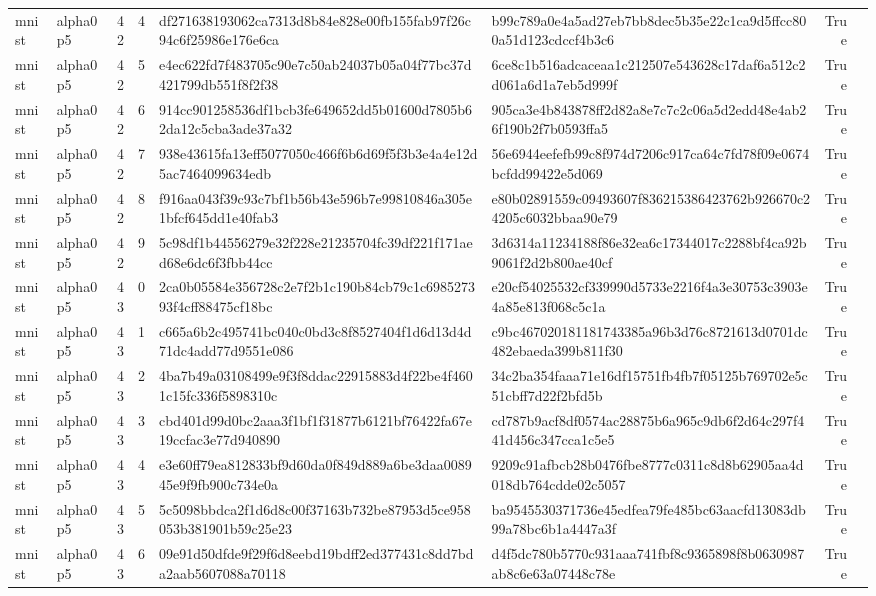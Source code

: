 \begin{tabular}{llrrllrl}
mnist & alpha0p5 & 42 & 4 & df271638193062ca7313d8b84e828e00fb155fab97f26c94c6f25986e176e6ca & b99c789a0e4a5ad27eb7bb8dec5b35e22c1ca9d5ffcc800a51d123cdccf4b3c6 & True &  \\
mnist & alpha0p5 & 42 & 5 & e4ec622fd7f483705c90e7c50ab24037b05a04f77bc37d421799db551f8f2f38 & 6ce8c1b516adcaceaa1c212507e543628c17daf6a512c2d061a6d1a7eb5d999f & True &  \\
mnist & alpha0p5 & 42 & 6 & 914cc901258536df1bcb3fe649652dd5b01600d7805b62da12c5cba3ade37a32 & 905ca3e4b843878ff2d82a8e7c7c2c06a5d2edd48e4ab26f190b2f7b0593ffa5 & True &  \\
mnist & alpha0p5 & 42 & 7 & 938e43615fa13eff5077050c466f6b6d69f5f3b3e4a4e12d5ac7464099634edb & 56e6944eefefb99c8f974d7206c917ca64c7fd78f09e0674bcfdd99422e5d069 & True &  \\
mnist & alpha0p5 & 42 & 8 & f916aa043f39c93c7bf1b56b43e596b7e99810846a305e1bfcf645dd1e40fab3 & e80b02891559c09493607f836215386423762b926670c24205c6032bbaa90e79 & True &  \\
mnist & alpha0p5 & 42 & 9 & 5c98df1b44556279e32f228e21235704fc39df221f171aed68e6dc6f3fbb44cc & 3d6314a11234188f86e32ea6c17344017c2288bf4ca92b9061f2d2b800ae40cf & True &  \\
mnist & alpha0p5 & 43 & 0 & 2ca0b05584e356728c2e7f2b1c190b84cb79c1c698527393f4cff88475cf18bc & e20cf54025532cf339990d5733e2216f4a3e30753c3903e4a85e813f068c5c1a & True &  \\
mnist & alpha0p5 & 43 & 1 & c665a6b2c495741bc040c0bd3c8f8527404f1d6d13d4d71dc4add77d9551e086 & c9bc467020181181743385a96b3d76c8721613d0701dc482ebaeda399b811f30 & True &  \\
mnist & alpha0p5 & 43 & 2 & 4ba7b49a03108499e9f3f8ddac22915883d4f22be4f4601c15fc336f5898310c & 34c2ba354faaa71e16df15751fb4fb7f05125b769702e5c51cbff7d22f2bfd5b & True &  \\
mnist & alpha0p5 & 43 & 3 & cbd401d99d0bc2aaa3f1bf1f31877b6121bf76422fa67e19ccfac3e77d940890 & cd787b9acf8df0574ac28875b6a965c9db6f2d64c297f441d456c347cca1c5e5 & True &  \\
mnist & alpha0p5 & 43 & 4 & e3e60ff79ea812833bf9d60da0f849d889a6be3daa008945e9f9fb900c734e0a & 9209c91afbcb28b0476fbe8777c0311c8d8b62905aa4d018db764cdde02c5057 & True &  \\
mnist & alpha0p5 & 43 & 5 & 5c5098bbdca2f1d6d8c00f37163b732be87953d5ce958053b381901b59c25e23 & ba9545530371736e45edfea79fe485bc63aacfd13083db99a78bc6b1a4447a3f & True &  \\
mnist & alpha0p5 & 43 & 6 & 09e91d50dfde9f29f6d8eebd19bdff2ed377431c8dd7bda2aab5607088a70118 & d4f5dc780b5770c931aaa741fbf8c9365898f8b0630987ab8c6e63a07448c78e & True &  \\

\end{tabular}
